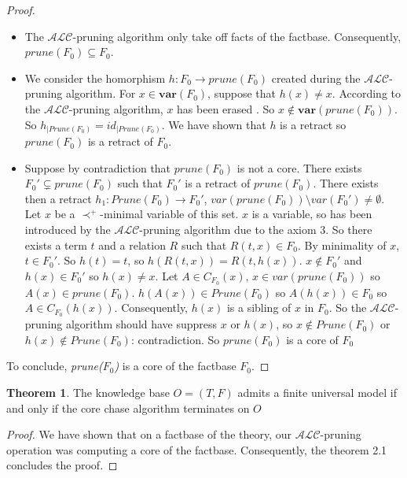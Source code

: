 \documentclass{article}
\theoremstyle{definition}
\newtheorem{theorem}{Theorem}[section]
\theoremstyle{remark}
\begin{document}
\begin{proof}
\begin{itemize}
\item The $\mathcal{ALC}$-pruning algorithm only take off facts of the factbase. Consequently, $\textit{prune}(F_0) \subseteq F_0$.
\item We consider the homorphism $h:F_0 \to \textit{prune}(F_0)$ created during the $\mathcal{ALC}$-pruning algorithm. For $x \in \textbf{var}(F_0)$, suppose that $h(x) \neq x$. According to the $\mathcal{ALC}$-pruning algorithm, $x$ has been erased . So $x \notin \textbf{var}(\textit{prune}(F_0))$. So ${h}_{|\textit{Prune}(F_0)}=id_{|\textit{Prune}(F_0)}$. We have shown that $h$ is a retract so $\textit{prune}(F_0)$ is a retract of $F_0$.
\item Suppose by contradiction that $\textit{prune}(F_0)$ is not a core. There exists $F_0' \subsetneq \textit{prune}(F_0)$ such that $F_0'$ is a retract of $\textit{prune}(F_0)$. There exists then a retract $h_1: Prune(F_0) \to F_0'$, $var(prune(F_0))\setminus var(F_0') \neq \emptyset$. Let $x$ be a $\prec^+$-minimal variable of this set. $x$ is a variable, so has been introduced by the $\mathcal{ALC}$-pruning algorithm due to the axiom 3. So there exists a term $t$ and a relation $R$ such that $R(t,x) \in F_0$. By minimality of $x$, $t \in F_0'$. So $h(t) = t$, so $h(R(t,x)) = R(t,h(x))$. $x \notin F_0'$ and $h(x) \in F_0'$ so $h(x) \neq x$. Let $A \in C_{F_0}(x)$, $x \in var(prune(F_0))$ so $A(x) \in prune(F_0)$. $h(A(x)) \in Prune(F_0)$ so $A(h(x)) \in F_0$ so $A \in C_{F_0}(h(x))$. Consequently, $h(x)$ is a sibling of $x$ in $F_0$. So the $\mathcal{ALC}$-pruning algorithm should have suppress $x$ or $h(x)$, so $x \notin Prune(F_0)$ or $h(x) \notin Prune(F_0)$: contradiction. So $prune(F_0)$ is a core of $F_0$
\end{itemize}
To conclude, \emph{prune($F_0$)} is a core of the factbase $F_0$.
\end{proof}

\begin{theorem} 
The knowledge base $O = (T,F)$ admits a finite universal model if and only if the core chase algorithm terminates on $O$
\end{theorem}

\begin{proof}
We have shown that on a factbase of the theory, our $\mathcal{ALC}$-pruning operation was computing a core of the factbase. Consequently, the theorem 2.1 concludes the proof. 
\end{proof}




\end{document}

